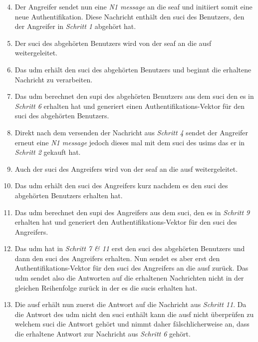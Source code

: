 \begin{enumerate}
\setcounter{enumi}{3}

\item Der Angreifer sendet nun eine \textit{N1 message} an die \gls{seaf} und initiiert somit eine neue Authentifikation.
Diese Nachricht enthält den \gls{suci} des Benutzers, den der Angreifer in \textit{Schritt 1} abgehört hat.

\item Der \gls{suci} des abgehörten Benutzers wird von der \gls{seaf} an die \gls{ausf} weitergeleitet.

\item Das \gls{udm} erhält den \gls{suci} des abgehörten Benutzers und beginnt die erhaltene Nachricht zu verarbeiten.

\item Das \gls{udm} berechnet den \gls{supi} des abgehörten Benutzers aus dem \gls{suci} den es in \textit{Schritt 6} erhalten hat und generiert einen Authentifikations-Vektor für den \gls{suci} des abgehörten Benutzers.

\item Direkt nach dem versenden der Nachricht aus \textit{Schritt 4} sendet der Angreifer erneut eine \textit{N1 message} jedoch dieses mal mit dem \gls{suci} des \gls{usim}s das er in \textit{Schritt 2} gekauft hat.

\item Auch der \gls{suci} des Angreifers wird von der \gls{seaf} an die \gls{ausf} weitergeleitet.

\item Das \gls{udm} erhält den \gls{suci} des Angreifers kurz nachdem es den \gls{suci} des abgehörten Benutzers erhalten hat.

\item Das \gls{udm} berechnet den \gls{supi} des Angreifers aus dem \gls{suci}, den es in \textit{Schritt 9} erhalten hat und generiert den Authentifikations-Vektor  für den \gls{suci} des Angreifers.

\item Das \gls{udm} hat in \textit{Schritt 7 \& 11} erst den \gls{suci} des abgehörten Benutzers und dann den \gls{suci} des Angreifers erhalten.
Nun sendet es aber erst den Authentifikations-Vektor für den \gls{suci} des Angreifers an die \gls{ausf} zurück.
Das \gls{udm} sendet also die Antworten auf die erhaltenen Nachrichten nicht in der gleichen Reihenfolge zurück in der es die \gls{suci}s erhalten hat.

\item Die \gls{ausf} erhält nun zuerst die Antwort auf die Nachricht aus \textit{Schritt 11}.
Da die Antwort des \gls{udm} nicht den \gls{suci} enthält kann die \gls{ausf} nicht überprüfen zu welchem \gls{suci} die Antwort gehört und nimmt daher fälschlicherweise an, dass die erhaltene Antwort zur Nachricht aus \textit{Schritt 6} gehört.


\end{enumerate}
